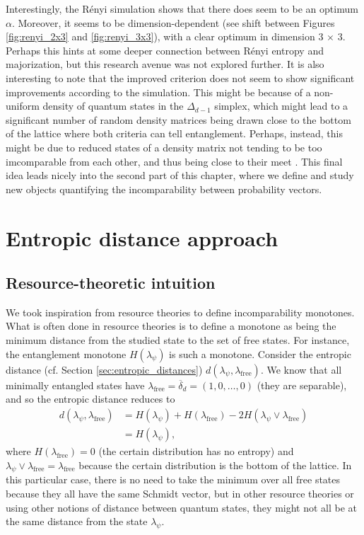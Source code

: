 Interestingly, the Rényi simulation shows that there does seem to be an optimum $\alpha$. Moreover, it seems to be dimension-dependent (see shift between Figures \ref{fig:renyi_2x3} and \ref{fig:renyi_3x3}), with a clear optimum in dimension 3 $\times$ 3. Perhaps this hints at some deeper connection between Rényi entropy and majorization, but this research avenue was not explored further. It is also interesting to note that the improved criterion does not seem to show significant improvements according to the simulation. This might be because of a non-uniform density of quantum states in the $\Delta_{d-1}$ simplex, which might lead to a significant number of random density matrices being drawn close to the bottom of the lattice where both criteria can tell entanglement. Perhaps, instead, this might be due to reduced states of a density matrix not tending to be too imcomparable from each other, and thus being close to their meet%
. This final idea leads nicely into the second part of this chapter, where we define and study new objects quantifying the incomparability between probability vectors.



\section{Entropic distance approach}

\subsection{Resource-theoretic intuition}

We took inspiration from resource theories to define incomparability monotones. What is often done in resource theories is to define a monotone as being the minimum distance from the studied state to the set of free states. For instance, the entanglement monotone $H(\lambda_\psi)$ is such a monotone. Consider the entropic distance (cf. Section \ref{sec:entropic_distances}) $d(\lambda_\psi, \lambda_{\text{free}})$. We know that all minimally entangled states have $\lambda_\text{free} = \overline{\delta}_d = (1, 0, \dots, 0)$ (they are separable), and so the entropic distance reduces to
\begin{align}
    d(\lambda_\psi, \lambda_\text{free}) &= H(\lambda_\psi) + H(\lambda_\text{free}) - 2 H(\lambda_\psi \vee \lambda_\text{free})\\
                                      &= H(\lambda_\psi),
\end{align}
\noindent where $H(\lambda_\text{free}) = 0$ (the certain distribution has no entropy) and $\lambda_\psi \vee \lambda_\text{free} = \lambda_\text{free}$ because the certain distribution is the bottom of the lattice. In this particular case, there is no need to take the minimum over all free states because they all have the same Schmidt vector, but in other resource theories or using other notions of distance between quantum states, they might not all be at the same distance from the state $\lambda_\psi$.


